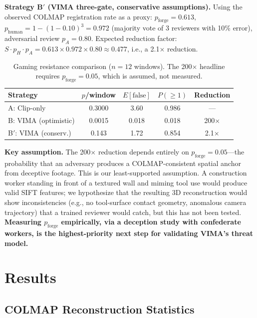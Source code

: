\documentclass[sigconf,nonacm]{acmart}
\begin{document}
\textbf{Strategy B$'$ (VIMA three-gate, conservative assumptions).}
Using the observed COLMAP registration rate as a proxy: $p_{\text{forge}} = 0.613$, $p_{\text{human}} = 1 - (1 - 0.10)^3 = 0.972$ (majority vote of 3 reviewers with 10\% error), adversarial review $p_A = 0.80$.
Expected reduction factor: $S \cdot p_H \cdot p_A = 0.613 \times 0.972 \times 0.80 \approx 0.477$, i.e., a 2.1$\times$ reduction.

\begin{table}[h]
\centering
\caption{Gaming resistance comparison ($n = 12$ windows).
The 200$\times$ headline requires $p_{\mathrm{forge}} = 0.05$, which is assumed, not measured.}
\begin{tabular}{lcccc}
\toprule
Strategy & $p$/window & $E[\text{false}]$ & $P(\geq 1)$ & Reduction \\
\midrule
A: Clip-only          & 0.3000 & 3.60  & 0.986 & --- \\
B: VIMA (optimistic) & 0.0015 & 0.018 & 0.018 & 200$\times$ \\
B$'$: VIMA (conserv.)& 0.143  & 1.72  & 0.854 & 2.1$\times$ \\
\bottomrule
\end{tabular}
\label{tab:gaming}
\end{table}

\textbf{Key assumption.}
The 200$\times$ reduction depends entirely on $p_{\mathrm{forge}} = 0.05$---the probability that an adversary produces a COLMAP-consistent spatial anchor from deceptive footage.
This is our least-supported assumption.
A construction worker standing in front of a textured wall and miming tool use would produce valid SIFT features; we hypothesize that the resulting 3D reconstruction would show inconsistencies (e.g., no tool-surface contact geometry, anomalous camera trajectory) that a trained reviewer would catch, but this has not been tested.
\textbf{Measuring $p_{\mathrm{forge}}$ empirically, via a deception study with confederate workers, is the highest-priority next step for validating VIMA's threat model.}

\section{Results}
\label{sec:results}

\subsection{COLMAP Reconstruction Statistics}
\end{document}
